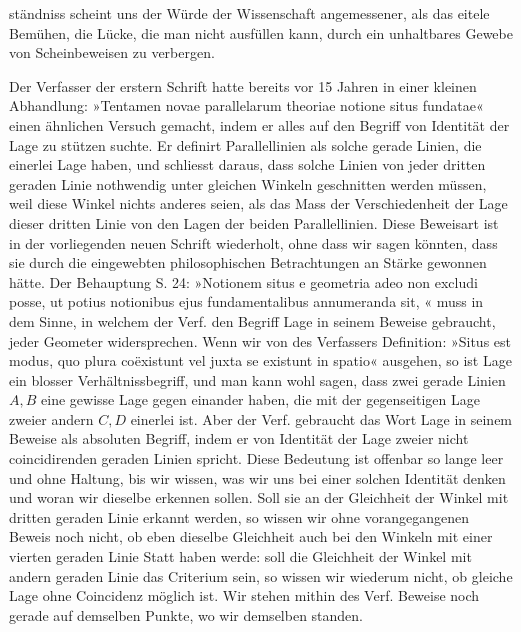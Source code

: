 ständniss scheint uns der Würde der Wissenschaft angemessener, als das eitele
Bemühen, die Lücke, die man nicht ausfüllen kann, durch ein unhaltbares Gewebe
von Scheinbeweisen zu verbergen.

Der Verfasser der erstern Schrift hatte bereits vor 15 Jahren in einer kleinen
Abhandlung: »Tentamen novae parallelarum theoriae notione situs fundatae«
einen ähnlichen Versuch gemacht, indem er alles auf den Begriff von Identität
der Lage zu stützen suchte. Er definirt Parallellinien als solche
gerade Linien, die einerlei Lage haben, und schliesst daraus, dass solche Linien
von jeder dritten geraden Linie nothwendig unter gleichen
Winkeln geschnitten werden müssen, weil diese Winkel nichts anderes
  seien, als das Mass der Verschiedenheit der Lage dieser dritten Linie von den
Lagen der beiden Parallellinien. Diese Beweisart ist in der vorliegenden neuen
Schrift wiederholt, ohne dass wir sagen könnten, dass sie durch die
eingewebten philosophischen Betrachtungen an Stärke gewonnen hätte. Der
Behauptung S. 24: »Notionem situs e geometria adeo non excludi posse, ut potius
notionibus ejus fundamentalibus annumeranda sit, « muss in dem Sinne, in welchem der Verf. den Begriff Lage in seinem
Beweise gebraucht, jeder Geometer widersprechen. Wenn wir von des
Verfassers Definition: »Situs est modus, quo plura coëxistunt vel juxta se
existunt in spatio« ausgehen, so ist Lage ein blosser Verhältnissbegriff, und man
kann wohl sagen, dass zwei gerade Linien $A,B$ eine gewisse Lage gegen einander
haben, die mit der gegenseitigen Lage zweier andern $C,D$ einerlei ist. Aber der
Verf. gebraucht das Wort Lage in seinem Beweise als absoluten Begriff, indem er
von Identität der Lage zweier nicht coincidirenden geraden Linien spricht. Diese
Bedeutung ist offenbar so lange leer und ohne Haltung, bis wir wissen, was wir
uns bei einer solchen Identität denken und woran wir dieselbe erkennen
sollen. Soll sie an der Gleichheit der Winkel mit  dritten
geraden Linie erkannt werden, so wissen wir ohne vorangegangenen Beweis noch
nicht, ob eben dieselbe Gleichheit auch bei den Winkeln mit einer vierten geraden
Linie Statt haben werde: soll die Gleichheit der Winkel mit  andern geraden Linie das Criterium sein, so wissen wir wiederum nicht, ob
gleiche Lage ohne Coincidenz möglich ist. Wir stehen mithin
 des Verf. Beweise noch gerade auf demselben Punkte, wo wir
 demselben standen.

